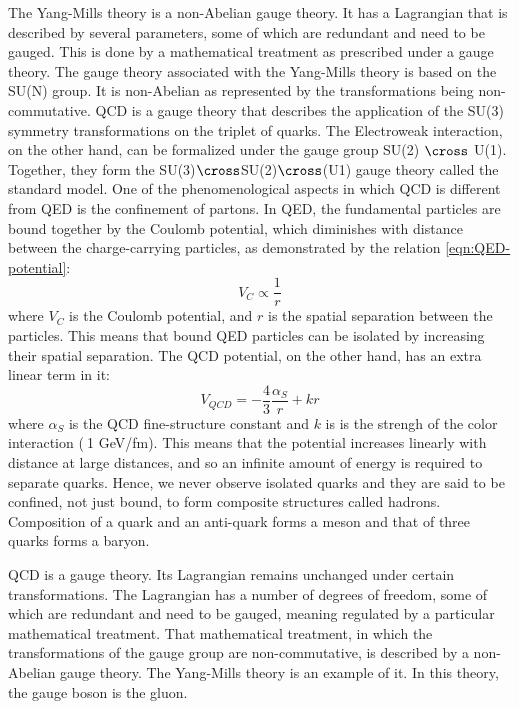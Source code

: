 The Yang-Mills theory is a non-Abelian gauge theory. It has a Lagrangian that is described by several parameters, some of which are redundant and need to be gauged. This is done by a mathematical treatment as prescribed under a gauge theory. The gauge theory associated with the Yang-Mills theory is based on the SU(N) group. It is non-Abelian as represented by the transformations being non-commutative. QCD is a gauge theory that describes the application of the SU(3) symmetry transformations on the triplet of quarks. The Electroweak interaction, on the other hand, can be formalized under the gauge group SU(2) $\cross$ U(1). Together, they form the SU(3)$\cross$SU(2)$\cross$(U1) gauge theory called the standard model.
One of the phenomenological aspects in which QCD is different from QED is the confinement of partons. In QED, the fundamental particles are bound together by the Coulomb potential, which diminishes with distance between the charge-carrying particles, as demonstrated by the relation \ref{eqn:QED-potential}:
\begin{equation}\label{eqn:QED-potential}
V_{C}\propto\frac{1}{r} 
\end{equation}
where $V_{C}$ is the Coulomb potential, and $r$ is the spatial separation between the particles. This means that bound QED particles can be isolated by increasing their spatial separation. The QCD potential, on the other hand, has an extra linear term in it:
\begin{equation}\label{eqn:QCD-potential}
V_{QCD} = -\frac{4}{3}\frac{\alpha_{S}}{r} + {k}{r} 
\end{equation}
where $\alpha_{S}$ is the QCD fine-structure constant and $k$ is is the strengh of the color interaction ($~$1 GeV/fm). This means that the potential increases linearly with distance at large distances, and so an infinite amount of energy is required to separate quarks. Hence, we never observe isolated quarks and they are said to be confined, not just bound, to form composite structures called hadrons.\cite{0954-3899-32-3-R01} Composition of a quark and an anti-quark forms a meson and that of three quarks forms a baryon.

QCD is a gauge theory. Its Lagrangian remains unchanged under certain transformations. The Lagrangian has a number of degrees of freedom, some of which are redundant and need to be gauged, meaning regulated by a particular mathematical treatment. That mathematical treatment, in which the transformations of the gauge group are non-commutative, is described by a non-Abelian gauge theory. The Yang-Mills theory is an example of it. In this theory, the gauge boson is the gluon. 

